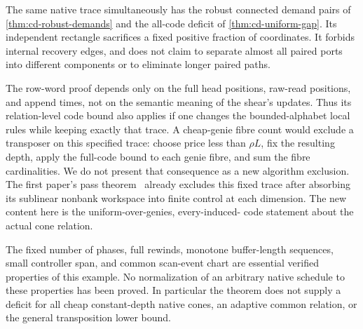 \begin{remark}\label{rem:cd-scope}
The same native trace simultaneously has the robust connected demand pairs
of \cref{thm:cd-robust-demands} and the all-code deficit of
\cref{thm:cd-uniform-gap}.  Its independent rectangle sacrifices a
fixed positive fraction of coordinates.  It forbids internal recovery
edges, and does not claim to separate almost all paired ports into
different components or to eliminate longer paired paths.

The row-word proof depends only on the full head positions, raw-read
positions, and append times, not on the semantic meaning of the shear's
updates.  Thus its relation-level code bound also applies if one changes
the bounded-alphabet local rules while keeping exactly that trace.  A
cheap-genie fibre count would exclude a transposer on this specified
trace: choose price less than $\rho L$, fix the resulting depth, apply
the full-code bound to each genie fibre, and sum the fibre cardinalities.
We do not present that consequence as a new algorithm exclusion.  The
first paper's pass theorem~\cite[Theorem P]{BrendeTapeCoding} already excludes this fixed trace after
absorbing its sublinear nonbank workspace into finite control at each
dimension.  The new content here is the uniform-over-genies, every-induced-
code statement about the actual cone relation.

The fixed number of phases, full rewinds, monotone buffer-length sequences,
small controller span, and common scan-event chart are essential verified
properties of this example.  No normalization of an arbitrary native
schedule to these properties has been proved.  In particular the theorem
does not supply a deficit for all cheap constant-depth native cones, an
adaptive common relation, or the general transposition lower bound.
\end{remark}
